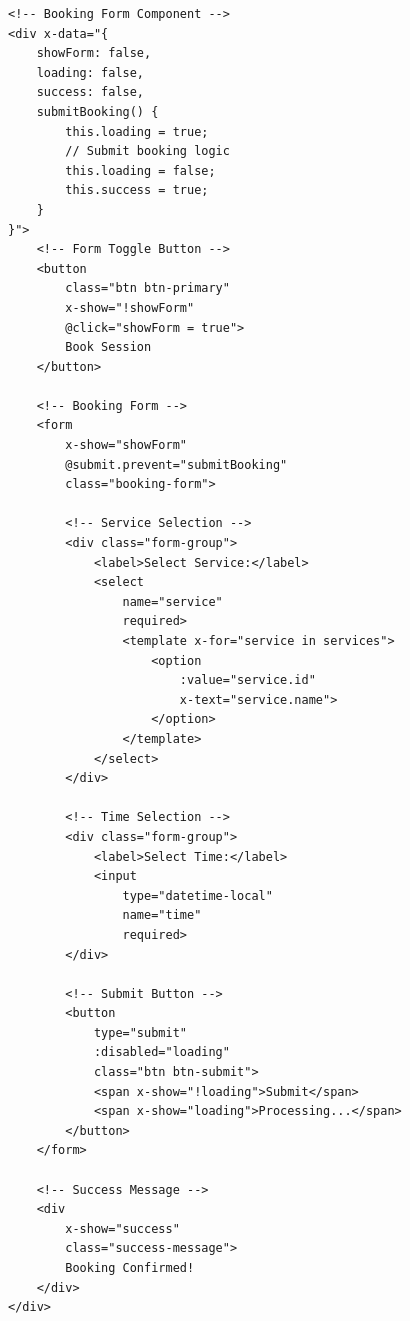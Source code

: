\begin{tcolorbox}[
    enhanced,
    title={AlpineJS Form Component},
    attach boxed title to top left,
    boxed title style={
        colback=info!50,
        colframe=info!50,
        arc=0mm,
    },
    colback=white,
    colframe=info!50,
    arc=0mm,
    fonttitle=\bfseries
]
    \begin{verbatim}
<!-- Booking Form Component -->
<div x-data="{ 
    showForm: false,
    loading: false,
    success: false,
    submitBooking() {
        this.loading = true;
        // Submit booking logic
        this.loading = false;
        this.success = true;
    }
}">
    <!-- Form Toggle Button -->
    <button 
        class="btn btn-primary"
        x-show="!showForm"
        @click="showForm = true">
        Book Session
    </button>

    <!-- Booking Form -->
    <form 
        x-show="showForm"
        @submit.prevent="submitBooking"
        class="booking-form">
        
        <!-- Service Selection -->
        <div class="form-group">
            <label>Select Service:</label>
            <select 
                name="service" 
                required>
                <template x-for="service in services">
                    <option 
                        :value="service.id"
                        x-text="service.name">
                    </option>
                </template>
            </select>
        </div>

        <!-- Time Selection -->
        <div class="form-group">
            <label>Select Time:</label>
            <input 
                type="datetime-local"
                name="time"
                required>
        </div>

        <!-- Submit Button -->
        <button 
            type="submit"
            :disabled="loading"
            class="btn btn-submit">
            <span x-show="!loading">Submit</span>
            <span x-show="loading">Processing...</span>
        </button>
    </form>

    <!-- Success Message -->
    <div 
        x-show="success"
        class="success-message">
        Booking Confirmed!
    </div>
</div>
    \end{verbatim}
\end{tcolorbox}

